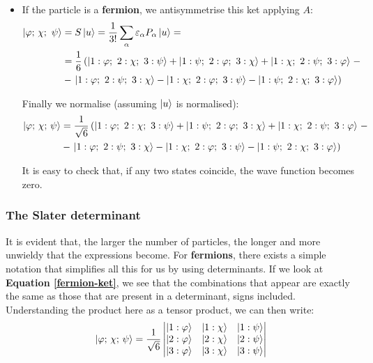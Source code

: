 \begin{itemize}
    \item If the particle is a \textbf{fermion}, we antisymmetrise this ket applying $A$:
    \begin{equation}
        \begin{split}
            \ket{\varphi;\, \chi;\ \psi} &= S\ket{u} = \frac{1}{3!}\sum_{\alpha} \varepsilon_\alpha P_\alpha\ket{u} = \\
            &= \frac{1}{6} \left(\ket{1:\varphi;\ 2:\chi;\ 3: \psi} + \ket{1:\psi;\ 2:\varphi;\ 3: \chi} + \ket{1:\chi;\ 2:\psi;\ 3: \varphi}\right. -\\ 
            &- \left.\ket{1:\varphi;\ 2:\psi;\ 3: \chi} - \ket{1:\chi;\ 2:\varphi;\ 3: \psi} - \ket{1:\psi;\ 2:\chi;\ 3: \varphi}\right)
        \end{split}
    \end{equation}

    Finally we normalise (assuming $\ket{u}$ is normalised):
    \begin{equation} \label{fermion-ket}
        \begin{split}
            \ket{\varphi;\, \chi;\, \psi} &= \frac{1}{ \sqrt{6}} \left(\ket{1:\varphi;\ 2:\chi;\ 3: \psi} + \ket{1:\psi;\ 2:\varphi;\ 3: \chi} + \ket{1:\chi;\ 2:\psi;\ 3: \varphi}\right. -\\ 
            &- \left.\ket{1:\varphi;\ 2:\psi;\ 3: \chi} - \ket{1:\chi;\ 2:\varphi;\ 3: \psi} - \ket{1:\psi;\ 2:\chi;\ 3: \varphi}\right)
        \end{split}
    \end{equation}

    It is easy to check that, if any two states coincide, the wave function becomes zero. 
\end{itemize}

\subsubsection{The Slater determinant}

It is evident that, the larger the number of particles, the longer and more unwieldy that the expressions become. For \textbf{fermions}, there exists a simple notation that simplifies all this for us by using determinants. If we look at \textbf{Equation \ref{fermion-ket}}, we see that the combinations that appear are exactly the same as those that are present in a determinant, signs included. Understanding the product here as a tensor product, we can then write:
\begin{equation}
    \ket{\varphi;\, \chi;\, \psi} = \frac{1}{\sqrt{6}}\left|\begin{matrix}
        \ket{1:\varphi} & \ket{1:\chi} & \ket{1:\psi} \\
        \ket{2:\varphi} & \ket{2:\chi} & \ket{2:\psi} \\
        \ket{3:\varphi} & \ket{3:\chi} & \ket{3:\psi} \\
    \end{matrix}\right|
\end{equation}

